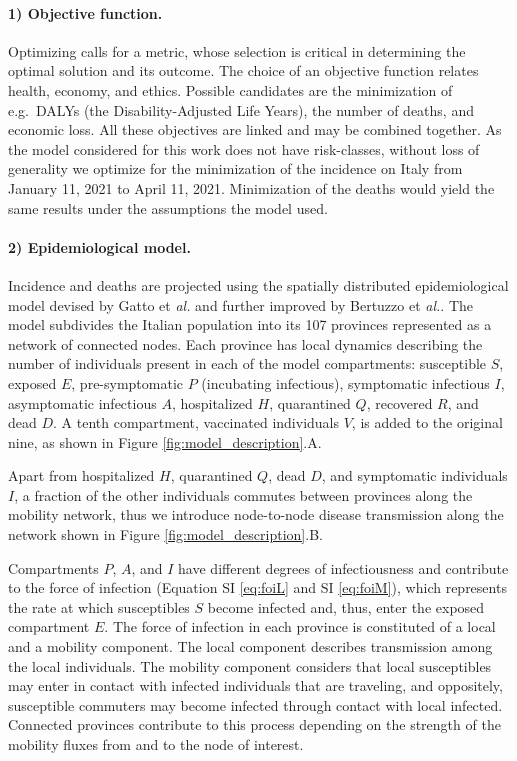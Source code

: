 \paragraph{1) Objective function.} Optimizing calls for a metric, whose selection is critical in determining the optimal solution and its outcome. The choice of an objective function relates health, economy, and ethics. Possible candidates are the minimization of e.g.~DALYs (the Disability-Adjusted Life Years), the number of deaths, and economic loss\cite{Du:ComparativeCosteffectivenessSARSCoV2:2021}. All these objectives are linked and may be combined together. As the model considered for this work does not have risk-classes, without loss of generality we optimize for the minimization of the incidence on Italy from January 11, 2021 to April 11, 2021. Minimization of the deaths would yield the same results under the assumptions the model used.

\paragraph{2) Epidemiological model.} Incidence and deaths are projected using the spatially distributed epidemiological model devised by Gatto et \textit{al.}\cite{Gatto:SpreadDynamicsCOVID19:2020} and further improved by Bertuzzo et \textit{al.}\cite{Bertuzzo:GeographyCOVID19Spread:2020}. The model subdivides the Italian population into its 107 provinces represented as a network of connected nodes. Each province has local dynamics describing the number of individuals present in each of the model compartments: susceptible $S$, exposed $E$, pre-symptomatic $P$ (incubating infectious), symptomatic infectious $I$, asymptomatic infectious $A$, hospitalized $H$, quarantined $Q$, recovered $R$, and dead $D$. A tenth compartment, vaccinated individuals $V$, is added to the original nine, as shown in Figure \ref{fig:model_description}.A.

Apart from hospitalized $H$, quarantined $Q$, dead $D$, and symptomatic individuals $I$, a fraction of the other individuals commutes between provinces along the mobility network, thus we introduce node-to-node disease transmission along the network shown in Figure \ref{fig:model_description}.B.

Compartments $P$, $A$, and $I$ have different degrees of infectiousness and contribute to the force of infection (Equation SI \eqref{eq:foiL} and SI \eqref{eq:foiM}), which represents the rate at which susceptibles $S$ become infected and, thus, enter the exposed compartment $E$. The force of infection in each province is constituted of a local and a mobility component. The local component describes transmission among the local individuals. The mobility component considers that local susceptibles may enter in contact with infected individuals that are traveling, and oppositely, susceptible commuters may become infected through contact with local infected. Connected provinces contribute to this process depending on the strength of the mobility fluxes from and to the node of interest.

